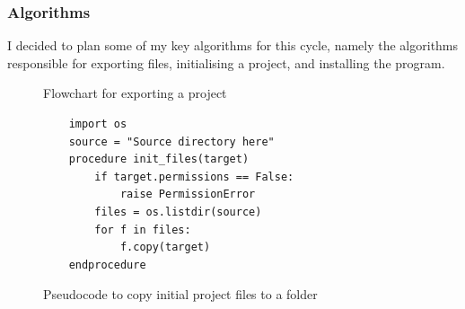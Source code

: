 \documentclass[11pt]{article}
\begin{document}
            \subsubsection{Algorithms}
                I decided to plan some of my key algorithms for this cycle, namely the algorithms responsible for exporting files, initialising a project, and installing the program.

                \begin{figure}[!ht]
                    \centering
                    \caption{Flowchart for exporting a project}
                    \label{flow:flowchart_design_c1}
                \end{figure}
                

                \begin{figure}[!ht]
                    \begin{verbatim}
    import os
    source = "Source directory here"
    procedure init_files(target)
        if target.permissions == False:
            raise PermissionError
        files = os.listdir(source)
        for f in files:
            f.copy(target)
    endprocedure
                    \end{verbatim}
                    \caption{Pseudocode to copy initial project files to a folder}
                    \label{pc:copy_to_folder_ps_c1}
                \end{figure}
\end{document}
